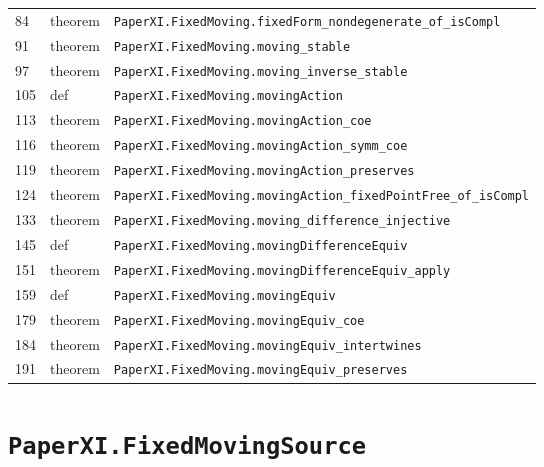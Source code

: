 \documentclass[10pt,oneside]{book}
\begin{document}
\begin{longtable}{@{}p{}p{}p{}@{}}
84&theorem&\nolinkurl{PaperXI.FixedMoving.fixedForm_nondegenerate_of_isCompl}\\

91&theorem&\nolinkurl{PaperXI.FixedMoving.moving_stable}\\

97&theorem&\nolinkurl{PaperXI.FixedMoving.moving_inverse_stable}\\

105&def&\nolinkurl{PaperXI.FixedMoving.movingAction}\\

113&theorem&\nolinkurl{PaperXI.FixedMoving.movingAction_coe}\\

116&theorem&\nolinkurl{PaperXI.FixedMoving.movingAction_symm_coe}\\

119&theorem&\nolinkurl{PaperXI.FixedMoving.movingAction_preserves}\\

124&theorem&\nolinkurl{PaperXI.FixedMoving.movingAction_fixedPointFree_of_isCompl}\\

133&theorem&\nolinkurl{PaperXI.FixedMoving.moving_difference_injective}\\

145&def&\nolinkurl{PaperXI.FixedMoving.movingDifferenceEquiv}\\

151&theorem&\nolinkurl{PaperXI.FixedMoving.movingDifferenceEquiv_apply}\\

159&def&\nolinkurl{PaperXI.FixedMoving.movingEquiv}\\

179&theorem&\nolinkurl{PaperXI.FixedMoving.movingEquiv_coe}\\

184&theorem&\nolinkurl{PaperXI.FixedMoving.movingEquiv_intertwines}\\

191&theorem&\nolinkurl{PaperXI.FixedMoving.movingEquiv_preserves}\\

\bottomrule\end{longtable}

\section{\texorpdfstring{\nolinkurl{PaperXI.FixedMovingSource}}{PaperXI.FixedMovingSource}}\label{module:PaperXI.FixedMovingSource}
\end{document}
